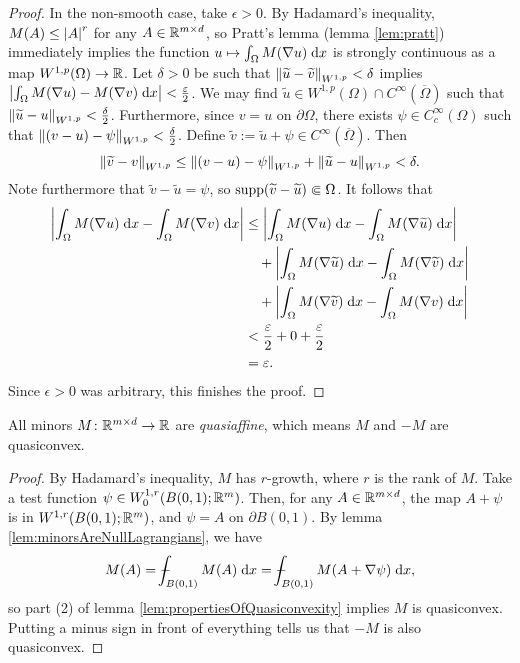 \begin{proof}
    In the non-smooth case, take $\epsilon > 0$. By Hadamard's inequality, $M(A) \leq \left\lvert {A} \right\rvert^r$ for any $A \in \mathbb{R}^{m \times d}$, so Pratt's lemma (lemma \ref{lem:pratt}) immediately implies the function $u \mapsto \int_\Omega M(\nabla u) \; \mathrm{d} x$ is strongly continuous as a map $W^{1,p}(\Omega) \to \mathbb{R}$. Let $\delta > 0$ be such that $\left\lVert {\widetilde{u} - \widetilde{v}} \right\rVert_{W^{1,p}} < \delta$ implies $\left\lvert {\int_\Omega M(\nabla u) - M(\nabla v) \; \mathrm{d}x} \right\rvert < \frac{\varepsilon}{2}$.
    We may find $\widetilde{u} \in W^{1,p}(\Omega) \cap C^\infty(\overline{\Omega})$ such that $\left\lVert {\widetilde{u} - u} \right\rVert_{W^{1,p}} < \frac{\delta}{2}$. Furthermore, since $v = u$ on $\partial\Omega$, there exists $\psi \in C_c^\infty(\Omega)$ such that $\left\lVert {(v - u) - \psi} \right\rVert_{W^{1,p}} < \frac{\delta}{2}$. Define $\widetilde{v} := \widetilde{u} + \psi \in C^\infty(\overline{\Omega})$. Then 
    \begin{equation}
        \left\lVert {\widetilde{v} - v} \right\rVert_{W^{1,p}} \leq \left\lVert {(v - u) - \psi} \right\rVert_{W^{1,p}} + \left\lVert {\widetilde{u} - u} \right\rVert_{W^{1,p}} < \delta.
    \end{equation}
    Note furthermore that $\widetilde{v} - \widetilde{u} = \psi$, so $\operatorname{supp}(\widetilde{v} - \widetilde{u}) \Subset \Omega$. It follows that 
    \begin{equation} \begin{aligned}
        \left\lvert {\int_\Omega M(\nabla u) \; \mathrm{d}x - \int_\Omega M(\nabla v) \; \mathrm{d}x} \right\rvert 
        &\leq \left\lvert {\int_\Omega M(\nabla u) \; \mathrm{d}x - \int_\Omega M(\nabla \widetilde{u}) \; \mathrm{d}x} \right\rvert \\
        &\quad + \left\lvert {\int_\Omega M(\nabla \widetilde{u}) \; \mathrm{d}x - \int_\Omega M(\nabla \widetilde{v}) \; \mathrm{d}x} \right\rvert \\
        &\quad + \left\lvert {\int_\Omega M(\nabla \widetilde{v}) \; \mathrm{d}x - \int_\Omega M(\nabla v) \; \mathrm{d}x} \right\rvert \\
        &< \frac{\varepsilon}{2} + 0 + \frac{\varepsilon}{2} \\\
        &= \varepsilon.
    \end{aligned} \end{equation}
    Since $\epsilon > 0$ was arbitrary, this finishes the proof.
\end{proof}

\begin{corollary}
    All minors $M \colon \mathbb{R}^{m \times d} \to \mathbb{R}$ are \textit{quasiaffine}, which means $M$ and $-M$ are quasiconvex.
\end{corollary}
\begin{proof}
    By Hadamard's inequality, $M$ has $r$-growth, where $r$ is the rank of $M$. Take a test function $\psi \in W_0^{1,r}(B(0,1);\mathbb{R}^m)$. Then, for any $A \in \mathbb{R}^{m \times d}$, the map $A + \psi$ is in $W^{1,r}(B(0,1);\mathbb{R}^m)$, and $\psi = A$ on $\partial B(0,1)$. By lemma \ref{lem:minorsAreNullLagrangians}, we have 
    \begin{equation}
        M(A) = \dashint_{B(0,1)} M(A) \; \d x = \dashint_{B(0,1)} M(A + \nabla \psi) \; \d x,
    \end{equation}
    so part (2) of lemma \ref{lem:propertiesOfQuasiconvexity} implies $M$ is quasiconvex. Putting a minus sign in front of everything tells us that $-M$ is also quasiconvex.
\end{proof}

